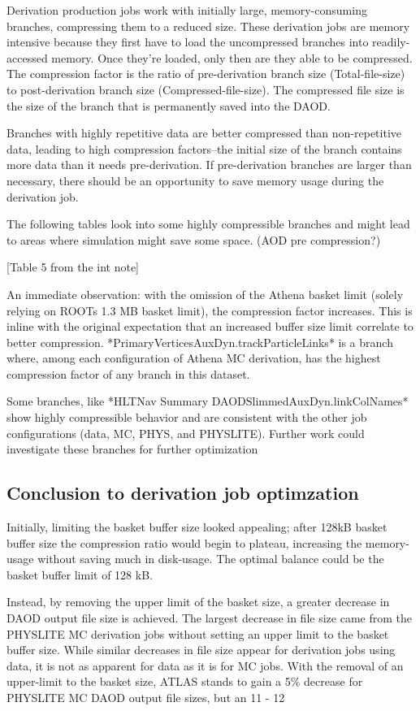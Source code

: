 Derivation production jobs work with initially large, memory-consuming branches, compressing them to a reduced size. These derivation jobs are memory intensive because they first have to load the uncompressed branches into readily-accessed memory. Once they're loaded, only then are they able to be compressed. The compression factor is the ratio of pre-derivation branch size (Total-file-size) to post-derivation branch size (Compressed-file-size). The compressed file size is the size of the branch that is permanently saved into the DAOD.  

Branches with highly repetitive data are better compressed than non-repetitive data, leading to high compression factors--the initial size of the branch contains more data than it needs pre-derivation. If pre-derivation branches are larger than necessary, there should be an opportunity to save memory usage during the derivation job. 

The following tables look into some highly compressible branches and might lead to areas where simulation might save some space. (AOD pre compression?)

[Table 5 from the int note]

An immediate observation: with the omission of the Athena basket limit (solely relying on ROOTs 1.3 MB basket limit), the compression factor increases. This is inline with the original expectation that an increased buffer size limit correlate to better compression. *PrimaryVerticesAuxDyn.trackParticleLinks* is a branch where, among each configuration of Athena MC derivation, has the highest compression factor of any branch in this dataset. 

Some branches, like *HLTNav Summary DAODSlimmedAuxDyn.linkColNames* show highly compressible behavior and are consistent with the other job configurations (data, MC, PHYS, and PHYSLITE). Further work could investigate these branches for further optimization 

\subsection{Conclusion to derivation job optimzation}

Initially, limiting the basket buffer size looked appealing; after 128kB basket buffer size the compression ratio would begin to plateau, increasing the memory-usage without saving much in disk-usage. The optimal balance could be the basket buffer limit of 128 kB. 

Instead, by removing the upper limit of the basket size, a greater decrease in DAOD output file size is achieved. The largest decrease in file size came from the PHYSLITE MC derivation jobs without setting an upper limit to the basket buffer size. While similar decreases in file size appear for derivation jobs using data, it is not as apparent for data as it is for MC jobs. With the removal of an upper-limit to the basket size, ATLAS stands to gain a 5\% decrease for PHYSLITE MC DAOD output file sizes, but an 11 - 12%

